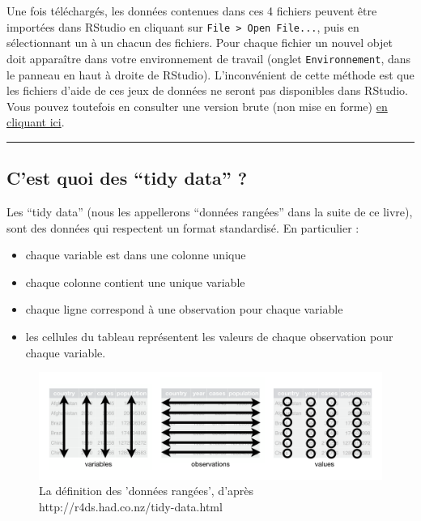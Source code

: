 \documentclass[a4paperpaper,]{article}
\providecommand{\tightlist}{%
  \setlength{\itemsep}{0pt}\setlength{\parskip}{0pt}}
\theoremstyle{definition}
\theoremstyle{definition}
\theoremstyle{definition}
\theoremstyle{remark}
\begin{document}
Une fois téléchargés, les données contenues dans ces 4 fichiers peuvent
être importées dans RStudio en cliquant sur
\texttt{File\ \textgreater{}\ Open\ File...}, puis en sélectionnant un à
un chacun des fichiers. Pour chaque fichier un nouvel objet doit
apparaître dans votre environnement de travail (onglet
\texttt{Environnement}, dans le panneau en haut à droite de RStudio).
L'inconvénient de cette méthode est que les fichiers d'aide de ces jeux
de données ne seront pas disponibles dans RStudio. Vous pouvez toutefois
en consulter une version brute (non mise en forme)
\href{https://github.com/rstudio/EDAWR/tree/master/man}{en cliquant
ici}.

\begin{center}\rule{0.5\linewidth}{\linethickness}\end{center}

\hypertarget{cest-quoi-des-tidy-data}{%
\subsection{C'est quoi des ``tidy data''
?}\label{cest-quoi-des-tidy-data}}

Les ``tidy data'' (nous les appellerons ``données rangées'' dans la
suite de ce livre), sont des données qui respectent un format
standardisé. En particulier :

\begin{itemize}
\tightlist
\item
  chaque variable est dans une colonne unique
\item
  chaque colonne contient une unique variable
\item
  chaque ligne correspond à une observation pour chaque variable
\item
  les cellules du tableau représentent les valeurs de chaque observation
  pour chaque variable.
\end{itemize}

\begin{figure}[htpb]

{\centering \includegraphics[width=0.9\linewidth]{images/tidy} 

}

\caption{La définition des 'données rangées', d'après http://r4ds.had.co.nz/tidy-data.html}\label{fig:tidyschema}
\end{figure}
\end{document}
